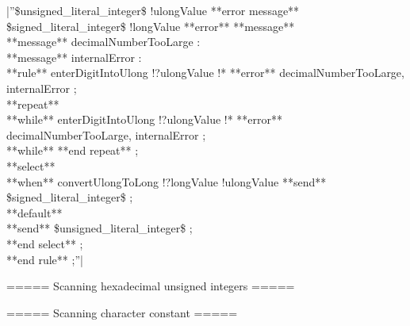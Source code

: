 |''\$unsigned\_literal\_integer\$ !ulongValue **error message** %
\$signed\_literal\_integer\$ !longValue **error** **message** %
\\ 
**message** decimalNumberTooLarge : %
\\ 
**message** internalError : %
\\ 
**rule** %
 enterDigitIntoUlong !?ulongValue !* **error** decimalNumberTooLarge, internalError ;\\ 
 **repeat**\\ 
 **while** %
  enterDigitIntoUlong !?ulongValue !* **error** decimalNumberTooLarge, internalError ;\\ 
 **while** %
 **end repeat** ;\\ 
 **select**\\ 
 **when** %
  convertUlongToLong !?longValue !ulongValue %
  **send** \$signed\_literal\_integer\$ ;\\ 
 **default**\\ 
  **send** \$unsigned\_literal\_integer\$ ;\\ 
 **end select** ;\\ 
**end rule** ;''|

===== Scanning hexadecimal unsigned integers =====

===== Scanning character constant =====

